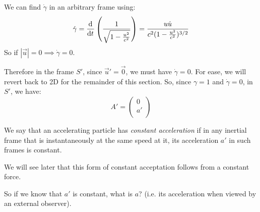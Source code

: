 \documentclass[../main.tex]{subfiles}
\begin{document}
We can find $\dot{\gamma}$ in an arbitrary frame using:
\[
  \dot{\gamma} = \deriv{}{t}\left(\frac{1}{\sqrt{1 - \frac{u^2}{c^2}}}\right) = \frac{u \dot{u}}{c^2(1 - \frac{u^2}{c^2})^{3/2}}
\]
So if $|\vec{u}| = 0 \implies \dot{\gamma} = 0$.

Therefore in the frame $S'$, since $\vec{u}' = \vec{0}$, we must have $\dot{\gamma} = 0$.
For ease, we will revert back to 2D for the remainder of this section.
So, since $\gamma = 1$ and $\dot{\gamma} = 0$, in $S'$, we have:
\[
  A' = \begin{pmatrix}
  0 \\
  a' \\
  \end{pmatrix}
\]
\begin{definition}
  We say that an accelerating particle has \textit{constant acceleration} if in any inertial frame that is instantaneously at the same speed at it, its acceleration $a'$ in such frames is constant.
\end{definition}
\begin{remark}
  We will see later that this form of constant acceptation follows from a constant force.
\end{remark}
So if we know that $a'$ is constant, what is $a$? (i.e. its acceleration when viewed by an external observer).
\end{document}
